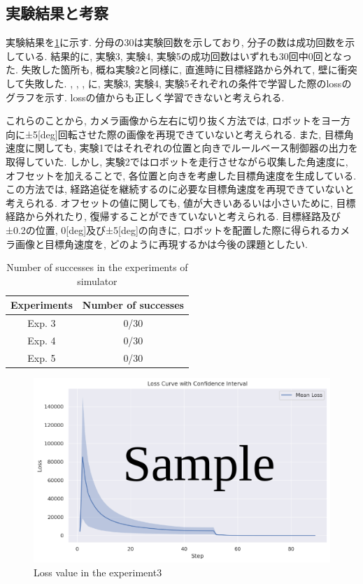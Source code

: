 \subsection{実験結果と考察}
実験結果を\ref{tb:inves}に示す. 分母の30は実験回数を示しており, 分子の数は成功回数を示している. 結果的に, 実験3, 実験4, 実験5の成功回数はいずれも30回中0回となった. 失敗した箇所も, 概ね実験2と同様に, 直進時に目標経路から外れて, 壁に衝突して失敗した. , , , に, 実験3, 実験4, 実験5それぞれの条件で学習した際のlossのグラフを示す. lossの値からも正しく学習できないと考えられる. 
\par これらのことから, カメラ画像から左右に切り抜く方法では, ロボットをヨー方向に±5[deg]回転させた際の画像を再現できていないと考えられる. また, 目標角速度に関しても, 実験1ではそれぞれの位置と向きでルールベース制御器の出力を取得していた. しかし, 実験2ではロボットを走行させながら収集した角速度に, オフセットを加えることで, 各位置と向きを考慮した目標角速度を生成している. この方法では, 経路追従を継続するのに必要な目標角速度を再現できていないと考えられる. オフセットの値に関しても, 値が大きいあるいは小さいために, 目標経路から外れたり, 復帰することができていないと考えられる. 目標経路及び±0.2の位置, 0[deg]及び±5[deg]の向きに, ロボットを配置した際に得られるカメラ画像と目標角速度を, どのように再現するかは今後の課題としたい. 

\newpage
\begin{table}[h]
  \centering
  \caption{Number of successes in the experiments of simulator}
  \begin{tabular}{|c|c|} \hline
      Experiments & Number of successes \\ \hline
      Exp. 3 & 0/30 \\ \hline
      Exp. 4 & 0/30 \\ \hline
      Exp. 5 & 0/30 \\ \hline
    \end{tabular}
  \label{tb:inves}
\end{table}

\begin{figure}[h]
  \centering
  \includegraphics[keepaspectratio, scale=0.55]{images/sample.png}
  \caption{Loss value in the experiment3}
  \label{Fig:sample3}
\end{figure}

